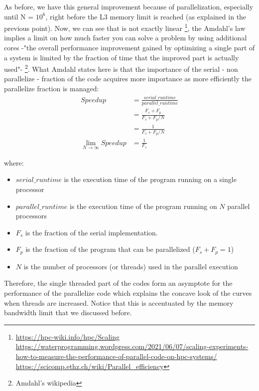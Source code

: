 \documentclass[unicode,11pt,a4paper,oneside,numbers=endperiod,openany]{scrartcl}
\begin{document}
As before, we have this general improvement because of parallelization, especially until N = $10^6$, right before the L3 memory limit is reached (as explained in the previous point).
Now, we can see that is not exactly linear \footnote{\url{https://hpc-wiki.info/hpc/Scaling} 
\newline \url{https://waterprogramming.wordpress.com/2021/06/07/scaling-experiments-how-to-measure-the-performance-of-parallel-code-on-hpc-systems/}
\newline \url{https://scicomp.ethz.ch/wiki/Parallel_efficiency}}, 
the Amdahl's law implies a limit on how much faster you can solve a problem by using additional cores -"the overall performance improvement gained by optimizing a single part of a system
is limited by the fraction of time that the improved part is actually used"- \footnote{Amdahl's wikipedia}. What Amdahl states here is that the importance 
of the serial - non parallelize - fraction of the code acquires more importance as more efficiently the parallelize fraction is managed:
\begin{align*}
    Speedup &= \frac{serial\_runtime}{parallel\_runtime} \\
    &= \frac{F_s + F_p}{F_s + F_p/N} \\
    &= \frac{1}{F_s + F_p/N} \\
    \lim_{N \to \infty} Speedup &= \frac{1}{F_s}
\end{align*}

where:
\begin{itemize}
    \item $serial\_runtime$ is the execution time of the program running on a single processor
    \item $parallel\_runtime$ is the execution time of the program running on $N$ parallel processors
    \item $F_s$ is the fraction of the serial implementation.
    \item $F_p$ is the fraction of the program that can be parallelized ($F_s + F_p = 1$)
    \item $N$ is the number of processors (or threads) used in the parallel execution
\end{itemize}

Therefore, the single threaded part of the codes form an asymptote for the performance of the parallelize code which 
explains the concave look of the curves when threads are increased. Notice that this is accentuated by the memory bandwidth limit that we discussed before.
\end{document}
